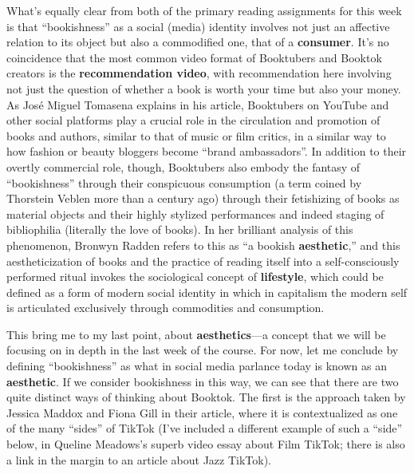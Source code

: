\documentclass[
  letterpaper,
  DIV=11,
  numbers=noendperiod,
  oneside]{scrartcl}
\begin{document}
What's equally clear from both of the primary reading assignments for
this week is that ``bookishness'' as a social (media) identity involves
not just an affective relation to its object but also a commodified one,
that of a \textbf{consumer}. It's no coincidence that the most common
video format of Booktubers and Booktok creators is the
\textbf{recommendation video}, with recommendation here involving not
just the question of whether a book is worth your time but also your
money. As José Miguel Tomasena explains in his article, Booktubers on
YouTube and other social platforms play a crucial role in the
circulation and promotion of books and authors, similar to that of music
or film critics, in a similar way to how fashion or beauty bloggers
become ``brand ambassadors''. In addition to their overtly commercial
role, though, Booktubers also embody the fantasy of ``bookishness''
through their conspicuous consumption (a term coined by Thorstein Veblen
more than a century ago) through their fetishizing of books as material
objects and their highly stylized performances and indeed staging of
bibliophilia (literally the love of books). In her brilliant analysis of
this phenomenon, Bronwyn Radden refers to this as ``a bookish
\textbf{aesthetic},'' and this aestheticization of books and the
practice of reading itself into a self-consciously performed ritual
invokes the sociological concept of \textbf{lifestyle}, which could be
defined as a form of modern social identity in which in capitalism the
modern self is articulated exclusively through commodities and
consumption.

This bring me to my last point, about \textbf{aesthetics}---a concept
that we will be focusing on in depth in the last week of the course. For
now, let me conclude by defining ``bookishness'' as what in social media
parlance today is known as an \textbf{aesthetic}. If we consider
bookishness in this way, we can see that there are two quite distinct
ways of thinking about Booktok. The first is the approach taken by
Jessica Maddox and Fiona Gill in their article, where it is
contextualized as one of the many ``sides'' of TikTok (I've included a
different example of such a ``side'' below, in Queline Meadows's superb
video essay about Film TikTok; there is also a link in the margin to an
article about Jazz TikTok).
\end{document}
